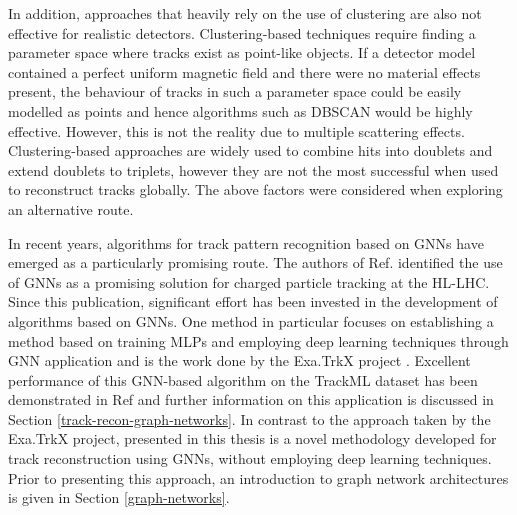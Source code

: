 In addition, approaches that heavily rely on the use of clustering are also not effective for realistic detectors. Clustering-based techniques require finding a parameter space where tracks exist as point-like objects. If a detector model contained a perfect uniform magnetic field and there were no material effects present, the behaviour of tracks in such a parameter space could be easily modelled as points and hence algorithms such as DBSCAN would be highly effective. However, this is not the reality due to multiple scattering effects. Clustering-based approaches are widely used to combine hits into doublets and extend doublets to triplets, however they are not the most successful when used to reconstruct tracks globally. The above factors were considered when exploring an alternative route. 

In recent years, algorithms for track pattern recognition based on GNNs have emerged as a particularly promising route. The authors of Ref. \cite{farrell2018novel} identified the use of GNNs as a promising solution for charged particle tracking at the HL-LHC. Since this publication, significant effort has been invested in the development of algorithms based on GNNs. One method in particular focuses on establishing a method based on training MLPs and employing deep learning techniques through GNN application and is the work done by the Exa.TrkX project \cite{ExaTrkX-website, Caillou:2815578}. Excellent performance of this GNN-based algorithm on the TrackML dataset \cite{refId0} has been demonstrated in Ref \cite{Ju_2021} and further information on this application is discussed in Section \ref{track-recon-graph-networks}. In contrast to the approach taken by the Exa.TrkX project, presented in this thesis is a novel methodology developed for track reconstruction using GNNs, without employing deep learning techniques. Prior to presenting this approach, an introduction to graph network architectures is given in Section \ref{graph-networks}.




